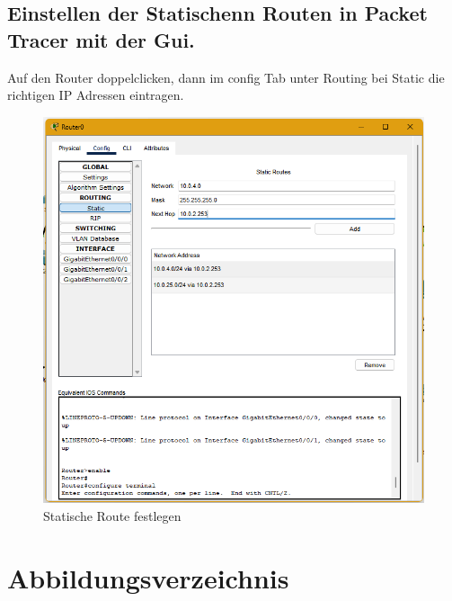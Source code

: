 \documentclass[a4paper]{article}
\begin{document}
\subsection{Einstellen der Statischenn Routen in Packet Tracer mit der Gui.}
Auf den Router doppelclicken, dann im config Tab unter Routing bei Static die richtigen IP Adressen eintragen.
\begin{figure}[h]
	\centering
	\includegraphics[scale=0.4]{ptgui.png}
	\caption{Statische Route festlegen}
\end{figure}
\newpage

\section{Abbildungsverzeichnis}

\listoffigures
\end{document}
